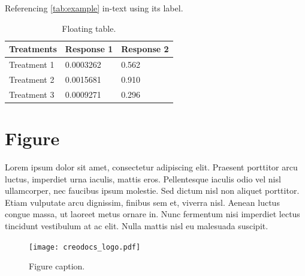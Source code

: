 \documentclass[
	11pt,
	fleqn,
	a4paper,
]{LegrandOrangeBook}
\begin{document}
Referencing \autoref{tab:example} in-text using its label.

\begin{table}[t] %
    \centering %
    \begin{tabular}{L{0.15\textwidth} R{0.15\textwidth} R{0.15\textwidth}} %
        \toprule
        \textbf{Treatments} & \textbf{Response 1} & \textbf{Response 2} \\
        \midrule
        Treatment 1         & 0.0003262           & 0.562               \\
        Treatment 2         & 0.0015681           & 0.910               \\
        Treatment 3         & 0.0009271           & 0.296               \\
        \bottomrule
    \end{tabular}
    \caption{Floating table.}
    \label{tab:floating} %
\end{table}


\section{Figure}

Lorem ipsum dolor sit amet, consectetur adipiscing elit. Praesent porttitor arcu luctus, imperdiet urna iaculis, mattis eros. Pellentesque iaculis odio vel nisl ullamcorper, nec faucibus ipsum molestie. Sed dictum nisl non aliquet porttitor. Etiam vulputate arcu dignissim, finibus sem et, viverra nisl. Aenean luctus congue massa, ut laoreet metus ornare in. Nunc fermentum nisi imperdiet lectus tincidunt vestibulum at ac elit. Nulla mattis nisl eu malesuada suscipit.

\begin{figure}[H] %
    \centering %
    \texttt{[image: creodocs\_logo.pdf]} %
    \caption{Figure caption.}
    \label{fig:placeholder} %
\end{figure}
\end{document}
